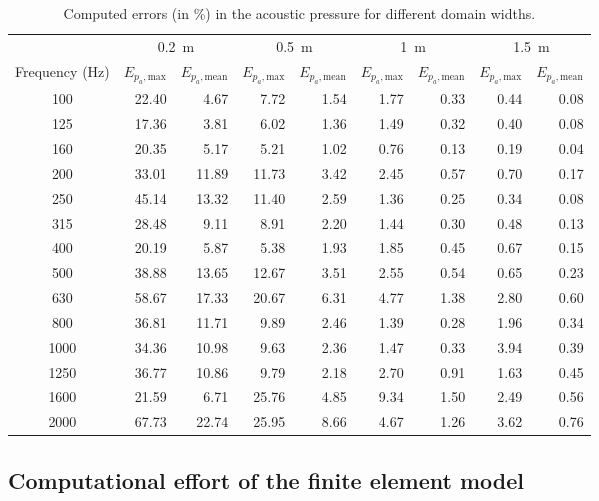 \begin{table}
	\centering
	\caption{Computed errors (in \%) in the acoustic pressure for different domain widths.}
	\label{tab:computed_errors}
	\begin{tabular}{crrrrrrrr}
		\toprule
		 & \multicolumn{2}{c}{\SI{0.2}{\meter}} & \multicolumn{2}{c}{\SI{0.5}{\meter}} & \multicolumn{2}{c}{\SI{1}{\meter}} & \multicolumn{2}{c}{\SI{1.5}{\meter}} \\ \cmidrule(lr){2-3} \cmidrule(lr){4-5} \cmidrule(lr){6-7} \cmidrule(lr){8-9}
		 Frequency (Hz)& $E_{p_a,\text{max}}$  & $E_{p_a,\text{mean}}$ & $E_{p_a,\text{max}}$ & $E_{p_a,\text{mean}}$ & $E_{p_a,\text{max}}$ & $E_{p_a,\text{mean}}$ & $E_{p_a,\text{max}}$ & $E_{p_a,\text{mean}}$ \\
		 \midrule
		 100 & 22.40 & 4.67 & 7.72 & 1.54 & 1.77 & 0.33 & 0.44 & 0.08 \\ 
		 125 & 17.36 & 3.81 & 6.02 & 1.36 & 1.49 & 0.32 & 0.40 & 0.08 \\ 
		 160 & 20.35 & 5.17 & 5.21 & 1.02 & 0.76 & 0.13 & 0.19 & 0.04 \\ 
		 200 & 33.01 & 11.89 & 11.73 & 3.42 & 2.45 & 0.57 & 0.70 & 0.17 \\ 
		 250 & 45.14 & 13.32 & 11.40 & 2.59 & 1.36 & 0.25 & 0.34 & 0.08 \\ 
		 315 & 28.48 & 9.11 & 8.91 & 2.20 & 1.44 & 0.30 & 0.48 & 0.13 \\ 
		 400 & 20.19 & 5.87 & 5.38 & 1.93 & 1.85 & 0.45 & 0.67 & 0.15 \\ 
		 500 & 38.88 & 13.65 & 12.67 & 3.51 & 2.55 & 0.54 & 0.65 & 0.23 \\ 
		 630 & 58.67 & 17.33 & 20.67 & 6.31 & 4.77 & 1.38 & 2.80 & 0.60 \\ 
		 800 & 36.81 & 11.71 & 9.89 & 2.46 & 1.39 & 0.28 & 1.96 & 0.34 \\ 
		 1000 & 34.36 & 10.98 & 9.63 & 2.36 & 1.47 & 0.33 & 3.94 & 0.39 \\ 
		 1250 & 36.77 & 10.86 & 9.79 & 2.18 & 2.70 & 0.91 & 1.63 & 0.45 \\ 
		 1600 & 21.59 & 6.71 & 25.76 & 4.85 & 9.34 & 1.50 & 2.49 & 0.56 \\ 
		 2000 & 67.73 & 22.74 & 25.95 & 8.66 & 4.67 & 1.26 & 3.62 & 0.76 \\
		 \bottomrule		
	\end{tabular}
\end{table}


\newpage
\subsection*{Computational effort of the finite element model}

